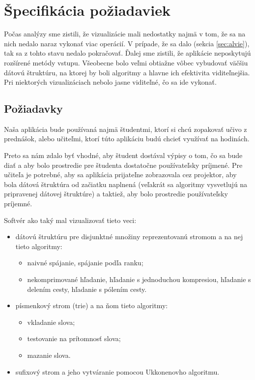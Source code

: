 \clearpage
\section{Špecifikácia požiadaviek}

Počas analýzy sme zistili, že vizualizácie mali nedostatky najmä v tom, že sa 
na nich nedalo naraz vykonať viac operácií. V prípade, že sa dalo (sekcia 
\ref{sec:alvie}), tak sa z tohto stavu nedalo pokračovať. Ďalej sme zistili, 
že aplikácie neposkytujú rozšírené metódy vstupu. Všeobecne bolo veľmi 
obtiažne vôbec vybudovať väčšiu dátovú štruktúru, na ktorej by boli algoritmy 
a hlavne ich efektivita viditeľnejšia. Pri niektorých vizualizáciach nebolo 
jasne viditeľné, čo sa ide vykonať.

\subsection{Požiadavky}

Naša aplikácia bude používaná najmä študentmi, ktorí si chcú zopakovať učivo 
z prednášok, alebo učiteľmi, ktorí túto aplikáciu budú chcieť využívať na 
hodinách.

Preto sa nám zdalo byť vhodné, aby študent dostával výpisy o tom, čo sa bude 
diať a aby bolo prostredie pre študenta dostatočne používateľsky príjmené. Pre 
učiteľa je potrebné, aby sa aplikácia prijateľne zobrazovala cez projektor, 
aby bola dátová štruktúra od začiatku naplnená (veľakrát sa algoritmy 
vysvetlujú na pripravenej dátovej štruktúre) a taktiež, aby bolo prostredie 
používateľsky príjemné.

Softvér ako taký mal vizualizovať tieto veci:
\begin{itemize}
\item dátovú štruktúru pre disjunktné množiny reprezentovanú stromom a na nej 
tieto algoritmy:
	\begin{itemize}
	\item naivné spájanie, spájanie podľa ranku;
	\item nekomprimované hľadanie, hľadanie s jednoduchou kompresiou, hľadanie s 
	delením cesty, hľadanie s pólením cesty.
	\end{itemize}
\item písmenkový strom (trie) a na ňom tieto algoritmy:
	\begin{itemize}
	\item vkladanie slova;
	\item testovanie na prítomnosť slova;
	\item mazanie slova.
	\end{itemize}
\item sufixový strom a jeho vytváranie pomocou Ukkonenovho algoritmu.
\end{itemize}

